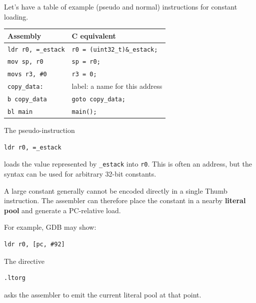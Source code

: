 \documentclass[a4paper,11pt]{article}
\begin{document}
Let's have a table of example (pseudo and normal) instructions for constant loading.
\begin{table}[H]
	\centering
	\begin{tabular}{ll}
		\hline
		Assembly                   & C equivalent \\
		\hline
		\texttt{ldr r0, =\_estack} &
		\texttt{r0 = (uint32\_t)\&\_estack;}      \\

		\texttt{mov sp, r0}        &
		\texttt{sp = r0;}                         \\

		\texttt{movs r3, \#0}      &
		\texttt{r3 = 0;}                          \\

		\texttt{copy\_data:}       &
		label: a name for this address            \\

		\texttt{b copy\_data}      &
		\texttt{goto copy\_data;}                 \\

		\texttt{bl main}           &
		\texttt{main();}                          \\
		\hline
	\end{tabular}
\end{table}

The pseudo-instruction

\begin{lstlisting}[language=arm]
ldr r0, =_estack
\end{lstlisting}

loads the value represented by \texttt{\_estack} into \texttt{r0}. This is
often an address, but the syntax can be used for arbitrary 32-bit constants.

A large constant generally cannot be encoded directly in a single Thumb
instruction. The assembler can therefore place the constant in a nearby
\textbf{literal pool} and generate a PC-relative load.

For example, GDB may show:

\begin{lstlisting}[language=arm]
ldr r0, [pc, #92]
\end{lstlisting}

The directive

\begin{lstlisting}[language=arm]
.ltorg
\end{lstlisting}

asks the assembler to emit the current literal pool at that point.
\end{document}
